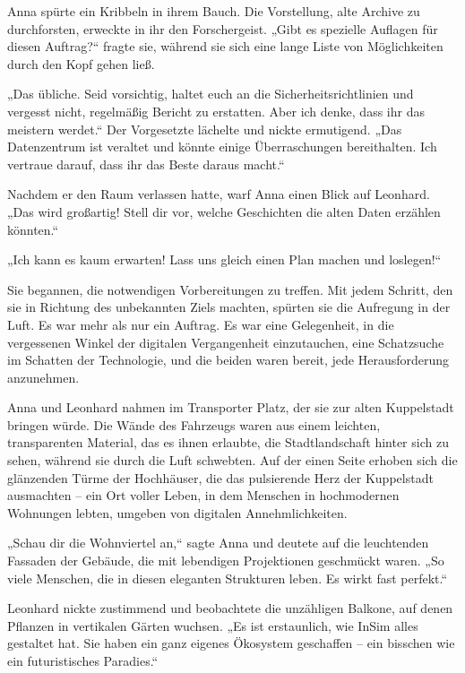 \documentclass[
]{article}
\begin{document}
Anna spürte ein Kribbeln in ihrem Bauch. Die Vorstellung, alte Archive
zu durchforsten, erweckte in ihr den Forschergeist. „Gibt es spezielle
Auflagen für diesen Auftrag?{\kern0pt}`` fragte sie, während sie sich
eine lange Liste von Möglichkeiten durch den Kopf gehen ließ.

„Das übliche. Seid vorsichtig, haltet euch an die Sicherheitsrichtlinien
und vergesst nicht, regelmäßig Bericht zu erstatten. Aber ich denke,
dass ihr das meistern werdet.`` Der Vorgesetzte lächelte und nickte
ermutigend. „Das Datenzentrum ist veraltet und könnte einige
Überraschungen bereithalten. Ich vertraue darauf, dass ihr das Beste
daraus macht.``

Nachdem er den Raum verlassen hatte, warf Anna einen Blick auf Leonhard.
„Das wird großartig! Stell dir vor, welche Geschichten die alten Daten
erzählen könnten.``

„Ich kann es kaum erwarten! Lass uns gleich einen Plan machen und
loslegen!{\kern0pt}``

Sie begannen, die notwendigen Vorbereitungen zu treffen. Mit jedem
Schritt, den sie in Richtung des unbekannten Ziels machten, spürten sie
die Aufregung in der Luft. Es war mehr als nur ein Auftrag. Es war eine
Gelegenheit, in die vergessenen Winkel der digitalen Vergangenheit
einzutauchen, eine Schatzsuche im Schatten der Technologie, und die
beiden waren bereit, jede Herausforderung anzunehmen.

Anna und Leonhard nahmen im Transporter Platz, der sie zur alten
Kuppelstadt bringen würde. Die Wände des Fahrzeugs waren aus einem
leichten, transparenten Material, das es ihnen erlaubte, die
Stadtlandschaft hinter sich zu sehen, während sie durch die Luft
schwebten. Auf der einen Seite erhoben sich die glänzenden Türme der
Hochhäuser, die das pulsierende Herz der Kuppelstadt ausmachten -- ein
Ort voller Leben, in dem Menschen in hochmodernen Wohnungen lebten,
umgeben von digitalen Annehmlichkeiten.

„Schau dir die Wohnviertel an,`` sagte Anna und deutete auf die
leuchtenden Fassaden der Gebäude, die mit lebendigen Projektionen
geschmückt waren. „So viele Menschen, die in diesen eleganten Strukturen
leben. Es wirkt fast perfekt.``

Leonhard nickte zustimmend und beobachtete die unzähligen Balkone, auf
denen Pflanzen in vertikalen Gärten wuchsen. „Es ist erstaunlich, wie
InSim alles gestaltet hat. Sie haben ein ganz eigenes Ökosystem
geschaffen -- ein bisschen wie ein futuristisches Paradies.``
\end{document}
